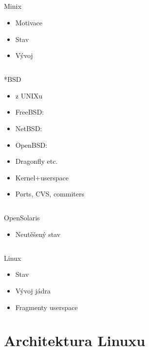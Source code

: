 \documentclass{beamer}
\begin{document}
\subsection{}
\begin{frame}{Minix}
\begin{itemize}
\item Motivace
\item Stav
\item Vývoj
\end{itemize}
\end{frame}

\subsection{}
\begin{frame}{*BSD}
\begin{itemize}
\item z UNIXu
\item FreeBSD:
\item NetBSD:
\item OpenBSD:
\item Dragonfly etc.
\item Kernel+userspace
\item Ports, CVS, commiters
\end{itemize}
\end{frame}

\subsection{}
\begin{frame}{OpenSolaris}
\begin{itemize}
\item Neutěšený stav
\end{itemize}
\end{frame}

\subsection{}
\begin{frame}{Linux}
\begin{itemize}
\item Stav
\item Vývoj jádra
\item Fragmenty userspace
\end{itemize}
\end{frame}


\section{Architektura Linuxu}
\end{document}
